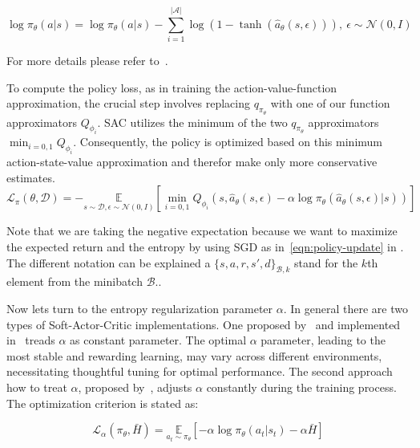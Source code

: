 \begin{equation*}
	\log \pi_\theta(a|s) = \log \pi_\theta(a|s) - \sum_{i=1}^{|\mathcal{A}|} \log(1 - \tanh(\hat{a}_\theta(s, \epsilon))), \ \epsilon \sim \mathcal{N}(0, I)
\end{equation*}

For more details please refer to~\cite{SAC_Applications_Paper}.

To compute the policy loss, as in training the action-value-function approximation, the crucial step involves replacing $q_{\pi_\theta}$ with one of our function approximators $Q_{\phi_i}$. SAC utilizes the minimum of the two $q_{\pi_\theta}$ approximators $\min_{i=0,1} Q_{\phi_i}$. Consequently, the policy is optimized based on this minimum action-state-value approximation and therefor make only more conservative estimates.
\begin{equation}\label{eqn:policy-loss}
	\mathcal{L}_\pi(\theta, \mathcal{D}) = - \underset{s\sim\mathcal{D}, \epsilon\sim\mathcal{N}(0, I)}{\mathbb{E}}\left[\min_{i=0,1}Q_{\phi_i}(s, \hat{a}_\theta(s, \epsilon) - \alpha \log \pi_\theta(\hat{a}_\theta(s, \epsilon)| s))\right]
\end{equation}

Note that we are taking the negative expectation because we want to maximize the expected return and the entropy by using SGD as in~\eqref{eqn:policy-update} in . The different notation can be explained a ${\{s, a, r, s', d\}}_{\mathcal{B}, k}$ stand for the $k$th element from the minibatch $\mathcal{B}$..

Now lets turn to the entropy regularization parameter $\alpha$. In general there are two types of Soft-Actor-Critic implementations. One proposed by~\cite{SAC_Paper} and implemented in~\cite{stable-baselines3} treads $\alpha$ as constant parameter.  The optimal $\alpha$ parameter, leading to the most stable and rewarding learning, may vary across different environments, necessitating thoughtful tuning for optimal performance.
The second approach how to treat $\alpha$, proposed by~\cite{SAC_Applications_Paper}, adjusts $\alpha$ constantly during the training process. The optimization criterion is stated as:

\begin{equation}\label{eqn:alpha-criterion}
	\mathcal{L}_\alpha(\pi_\theta, \bar{H}) = \underset{a_t\sim\pi_\theta}{\mathbb{E}}\left[-\alpha \log \pi_\theta(a_t|s_t) - \alpha \bar{H}\right]
\end{equation}

